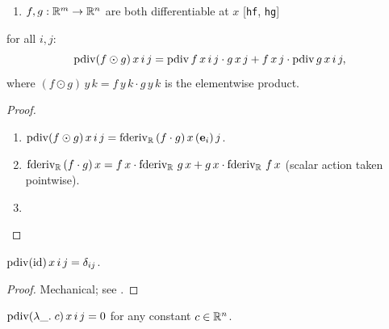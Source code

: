 \begin{theorem}
  \label{ax:pdiv_mul}
  \leanok
  \Assume{}
  \begin{enumerate}
    \item \(f, g : \mathbb{R}^{m} \to \mathbb{R}^{n}\) are both differentiable at
          \(x\) \hfill[\texttt{hf}, \texttt{hg}]
  \end{enumerate}
  \Prove{} for all \(i, j\):
  \[
    \operatorname{pdiv}(f \odot g)\, x\, i\, j
      = \operatorname{pdiv} f\, x\, i\, j \cdot g\, x\, j
      + f\, x\, j \cdot \operatorname{pdiv} g\, x\, i\, j,
  \]
  where \((f \odot g)\, y\, k = f\,y\,k \cdot g\,y\,k\) is the
  elementwise product.
\end{theorem}

\begin{proof}
\leanok
\begin{enumerate}
  \item \(\operatorname{pdiv}(f \odot g)\, x\, i\, j
          = \operatorname{fderiv}_{\mathbb{R}}\,(f \cdot g)\, x\, (\mathbf{e}_i)\, j\).
  \item \(\operatorname{fderiv}_{\mathbb{R}}\,(f \cdot g)\, x
          = f\,x \cdot \operatorname{fderiv}_{\mathbb{R}}\, g\, x
          + g\,x \cdot \operatorname{fderiv}_{\mathbb{R}}\, f\, x\)
    (scalar action taken pointwise).
  \item \Qed{}
\end{enumerate}
\end{proof}

\begin{theorem}
  \label{ax:pdiv_id}
  \leanok
  \(\operatorname{pdiv}(\mathrm{id})\, x\, i\, j = \delta_{ij}\).
\end{theorem}

\begin{proof}
\leanok
Mechanical; see .
\end{proof}

\begin{theorem}
  \label{ax:pdiv_const}
  \leanok
  \(\operatorname{pdiv}(\lambda\_.\; c)\, x\, i\, j = 0\) for any constant
  \(c \in \mathbb{R}^{n}\).
\end{theorem}

